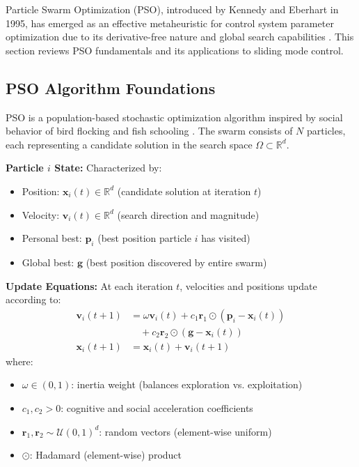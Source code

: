Particle Swarm Optimization (PSO), introduced by Kennedy and Eberhart in 1995, has emerged as an effective metaheuristic for control system parameter optimization due to its derivative-free nature and global search capabilities \cite{kennedy1995pso}. This section reviews PSO fundamentals and its applications to sliding mode control.

\subsection{PSO Algorithm Foundations}

PSO is a population-based stochastic optimization algorithm inspired by social behavior of bird flocking and fish schooling \cite{kennedy1995pso,eberhart1995new}. The swarm consists of $N$ particles, each representing a candidate solution in the search space $\Omega \subset \mathbb{R}^d$.

\textbf{Particle $i$ State:} Characterized by:
\begin{itemize}
\item Position: $\mathbf{x}_i(t) \in \mathbb{R}^d$ (candidate solution at iteration $t$)
\item Velocity: $\mathbf{v}_i(t) \in \mathbb{R}^d$ (search direction and magnitude)
\item Personal best: $\mathbf{p}_i$ (best position particle $i$ has visited)
\item Global best: $\mathbf{g}$ (best position discovered by entire swarm)
\end{itemize}

\textbf{Update Equations:} At each iteration $t$, velocities and positions update according to:
\begin{align}
\mathbf{v}_i(t+1) &= \omega \mathbf{v}_i(t) + c_1 \mathbf{r}_1 \odot (\mathbf{p}_i - \mathbf{x}_i(t)) \nonumber \\
&\quad + c_2 \mathbf{r}_2 \odot (\mathbf{g} - \mathbf{x}_i(t)) \label{eq:pso_velocity} \\
\mathbf{x}_i(t+1) &= \mathbf{x}_i(t) + \mathbf{v}_i(t+1) \label{eq:pso_position}
\end{align}
where:
\begin{itemize}
\item $\omega \in (0,1)$: inertia weight (balances exploration vs. exploitation)
\item $c_1, c_2 > 0$: cognitive and social acceleration coefficients
\item $\mathbf{r}_1, \mathbf{r}_2 \sim \mathcal{U}(0,1)^d$: random vectors (element-wise uniform)
\item $\odot$: Hadamard (element-wise) product
\end{itemize}

